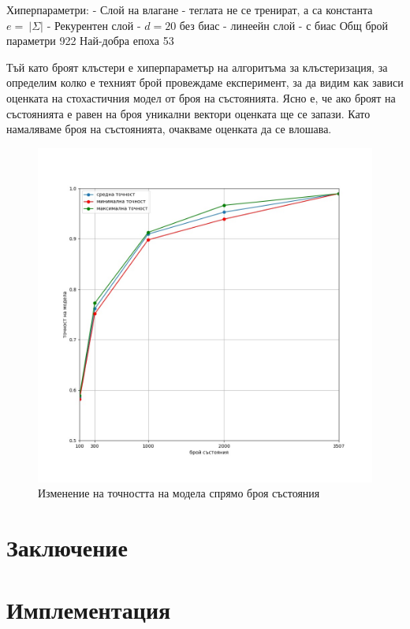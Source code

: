 \documentclass[a4paper,12pt]{article}
\begin{document}
Хиперпараметри:
- Слой на влагане - теглата не се тренират, а са константа $e =\:|\Sigma|$ 
- Рекурентен слой - $d = 20$ без биас
- линеейн слой - с биас 
Общ брой параметри  922
Най-добра епоха 53

Тъй като броят клъстери е хиперпараметър на алгоритъма за клъстеризация, за определим колко е техният брой провеждаме експеримент, за да видим как зависи оценката на стохастичния модел от броя на състоянията. Ясно е, че ако броят на състоянията е равен на броя уникални вектори оценката ще се запази. Като намаляваме броя на състоянията, очакваме оценката да се влошава. 

\begin{figure}[H]
  \centering
  \includegraphics[width=\textwidth,height=\textheight,keepaspectratio]{figures/number-of-states-accuracy.jpg}
  \caption{Изменение на точността на модела спрямо броя състояния}
\end{figure}

\pagebreak

\section{Заключение}

\section{Имплементация}
\end{document}
